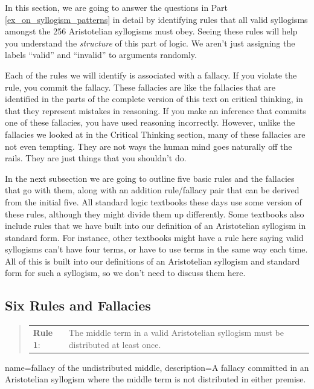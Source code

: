 In this section, we are going to answer the questions in Part \ref{ex_on_syllogism_patterns} in detail by identifying rules that all valid syllogisms amongst the 256 Aristotelian syllogisms must obey. Seeing these rules will help you understand the \emph{structure} of this part of logic. We aren't just  assigning the labels ``valid'' and ``invalid'' to arguments randomly. 

Each of the rules we will identify is associated with a fallacy. If you violate the rule, you commit the fallacy. These fallacies are like the fallacies that are identified in the parts of the complete version of this text on critical thinking, \label{ver_var} in that they represent mistakes in reasoning. If you make an inference that commits one of these fallacies, you have used reasoning incorrectly. However, unlike the fallacies we looked at in the Critical Thinking section, many of these fallacies are not even tempting. They are not ways the human mind goes naturally off the rails. They are just things that you shouldn't do.   

In the next subsection we are going to outline five basic rules and the fallacies that go with them, along with an addition rule/fallacy pair that can be derived from the initial five. All standard logic textbooks these days use some version of these rules, although they might divide them up differently. Some textbooks also include rules that we have built into our definition of an Aristotelian syllogism in standard form. For instance, other textbooks might have a rule here saying valid syllogisms can't have four terms, or have to use terms in the same way each time. All of this is built into our definitions of an Aristotelian syllogism and standard form for such a syllogism, so we don't need to discuss them here. 

\subsection{Six Rules and Fallacies}
\begin{quotation}
\begin{longtabu}{p{.1\linewidth}p{.9\linewidth}}
\textbf{Rule 1}: & The middle term in a valid Aristotelian syllogism must be distributed at least once. 
\end{longtabu}
\end{quotation}

{
name=fallacy of the undistributed middle,
description={A fallacy committed in an Aristotelian syllogism where the middle term is not distributed in either premise.}
}

